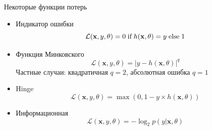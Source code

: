 \documentclass[10pt]{beamer}
\begin{document}
\begin{frame}{Некоторые функции потерь}

\begin{itemize}
\item Индикатор ошибки
\[
\mathcal{L}(\mathbf{x}, y, \theta) = 0 \text{\;if\;} h(\mathbf{x}, \theta) = y \text{\;else\;} 1
\]
\item Функция Минковского 
\[
\mathcal{L}(\mathbf{x}, y, \theta) = |y - h(\mathbf{x}, \theta)|^q
\]
Частные случаи: квадратичная $q = 2$, абсолютная ошибка $q = 1$
\item Hinge
\[
\mathcal{L}(\mathbf{x}, y, \theta) = \max(0, 1 - y \times h(\mathbf{x}, \theta))
\]
\item Информационная
\[
\mathcal{L}(\mathbf{x}, y, \theta) = - \log_2 p(y | \mathbf{x}, \theta)
\]
\begin{center}

\end{center}
\end{itemize}

\end{frame}
\end{document}
